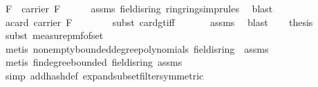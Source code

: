 \begin{isabellebody}
\ {\isachardoublequoteopen}{\isasymzero}\isactrlbsub F\isactrlesub \ {\isasymin}\ carrier\ F{\isachardoublequoteclose}\isanewline
\ \ \ \ \isamarkupfalse%
\ assms{\isacharparenleft}{\kern0pt}{}{\isacharparenright}{\kern0pt}\ field{\isachardot}{\kern0pt}is{\isacharunderscore}{\kern0pt}ring\ ring{\isachardot}{\kern0pt}ring{\isacharunderscore}{\kern0pt}simprules{\isacharparenleft}{\kern0pt}{}{\isacharparenright}{\kern0pt}\ \isamarkupfalse%
\ blast\isanewline
\isanewline
\ \ \isamarkupfalse%
\ a{\isacharcolon}{\kern0pt}{\isachardoublequoteopen}card\ {\isacharparenleft}{\kern0pt}carrier\ F{\isacharparenright}{\kern0pt}\ {\isachargreater}{\kern0pt}\ {}{\isachardoublequoteclose}\isanewline
\ \ \ \ \isamarkupfalse%
\ {\isacharparenleft}{\kern0pt}subst\ card{\isacharunderscore}{\kern0pt}gt{\isacharunderscore}{\kern0pt}{}{\isacharunderscore}{\kern0pt}iff{\isacharparenright}{\kern0pt}\ \isanewline
\ \ \ \ \isamarkupfalse%
\ assms{\isacharparenleft}{\kern0pt}{}{\isacharparenright}{\kern0pt}\ \isamarkupfalse%
\ blast\isanewline
\isanewline
\ \ \isamarkupfalse%
\ {\isacharquery}{\kern0pt}thesis\isanewline
\ \ \ \ \isamarkupfalse%
\ {\isacharparenleft}{\kern0pt}subst\ measure{\isacharunderscore}{\kern0pt}pmf{\isacharunderscore}{\kern0pt}of{\isacharunderscore}{\kern0pt}set{\isacharparenright}{\kern0pt}\isanewline
\ \ \ \ \ \ \isamarkupfalse%
\ {\isacharparenleft}{\kern0pt}metis\ non{\isacharunderscore}{\kern0pt}empty{\isacharunderscore}{\kern0pt}bounded{\isacharunderscore}{\kern0pt}degree{\isacharunderscore}{\kern0pt}polynomials\ field{\isachardot}{\kern0pt}is{\isacharunderscore}{\kern0pt}ring\ \ assms{\isacharparenleft}{\kern0pt}{}{\isacharparenright}{\kern0pt}{\isacharparenright}{\kern0pt}\isanewline
\ \ \ \ \ \isamarkupfalse%
\ {\isacharparenleft}{\kern0pt}metis\ fin{\isacharunderscore}{\kern0pt}degree{\isacharunderscore}{\kern0pt}bounded\ field{\isachardot}{\kern0pt}is{\isacharunderscore}{\kern0pt}ring\ assms{\isacharparenleft}{\kern0pt}{}{\isacharparenright}{\kern0pt}{\isacharparenright}{\kern0pt}\isanewline
\ \ \ \ \isamarkupfalse%
\ {\isacharparenleft}{\kern0pt}simp\ add{\isacharcolon}{\kern0pt}hash{\isacharunderscore}{\kern0pt}def\ expand{\isacharunderscore}{\kern0pt}subset{\isacharunderscore}{\kern0pt}filter{\isacharbrackleft}{\kern0pt}symmetric{\isacharbrackright}{\kern0pt}{\isacharparenright}{\kern0pt}\isanewline

\end{isabellebody}
